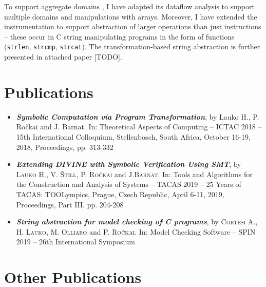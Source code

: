 To support aggregate domains \lart, I have adapted its data\-flow analysis to
support multiple domains and manipulations with \llvm arrays. Moreover, I have
extended the instrumentation to support abstraction of larger operations than
just \llvm instructions -- these occur in C string manipulating programs in the
form of functions (\texttt{strlen}, \texttt{strcmp}, \texttt{strcat}). The
transformation-based string abstraction is further presented in attached paper
[TODO].

\section{Publications}
\label{sec:publications}

\begin{itemize}

\item \textbf{\emph{Symbolic Computation via Program Transformation}}, by Lauko
H., P. Ročkai and J. Barnat.  In: Theoretical Aspects of Computing -- ICTAC 2018 --
15th International Colloquium, Stellenbosch, South Africa, October 16-19, 2018,
Proceedings, pp. 313-332~\cite{Lauko2018SymComp}


\item \emph{\textbf{Extending \textsf{DIVINE} with Symbolic Verification Using SMT}},
by \textsc{Lauko} H., V. \textsc{Štill}, P. \textsc{Ročkai} and J.\textsc{Barnat}.
In: Tools and Algorithms for the Construction and Analysis of Systems -- TACAS 2019 --
25 Years of TACAS: TOOLympics, Prague, Czech Republic, April 6-11, 2019,
Proceedings, Part III. pp. 204-208~\cite{Lauko2019Sym}


\item \textbf{\emph{String abstraction for model checking of C programs}},
by \textsc{Cortesi} A., H. \textsc{Lauko}, M. \textsc{Olliaro} and P. \textsc{Ročkai}.
In: Model Checking Software -- SPIN 2019 -- 26th International Symposium



\end{itemize}

\section{Other Publications}

